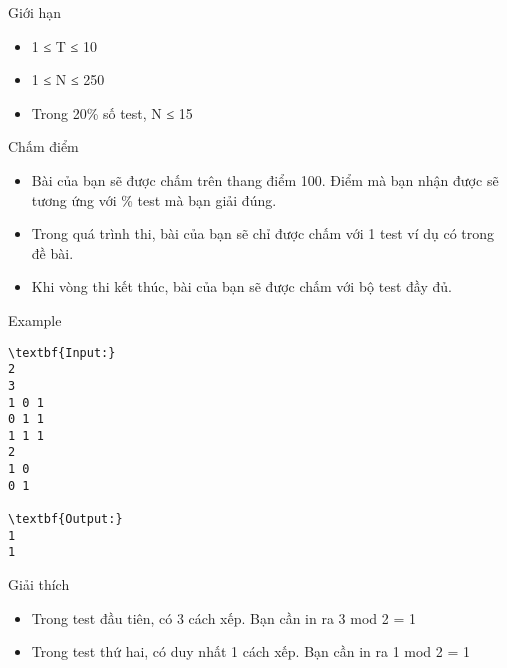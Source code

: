 Giới hạn  
\begin{itemize}
	\item     1 ≤ T ≤ 10   
	\item     1 ≤ N ≤ 250   
	\item     Trong 20\% số test, N ≤ 15   
\end{itemize}
   Chấm điểm  
\begin{itemize}
	\item     Bài của bạn sẽ được chấm trên thang điểm 100. Điểm mà bạn nhận được sẽ tương ứng với \% test mà bạn giải đúng.   
	\item     Trong quá trình thi, bài của bạn sẽ chỉ được chấm với 1 test ví dụ có trong đề bài.   
	\item     Khi vòng thi kết thúc, bài của bạn sẽ được chấm với bộ test đầy đủ.   
\end{itemize}
\begin{itemize}
\end{itemize}
   Example  
\begin{verbatim}
\textbf{Input:}
2
3
1 0 1
0 1 1
1 1 1
2
1 0
0 1

\textbf{Output:}
1
1
\end{verbatim}
   Giải thích  
\begin{itemize}
	\item     Trong test đầu tiên, có 3 cách xếp. Bạn cần in ra 3 mod 2 = 1   
	\item     Trong test thứ hai, có duy nhất 1 cách xếp. Bạn cần in ra 1 mod 2 = 1   
\end{itemize}